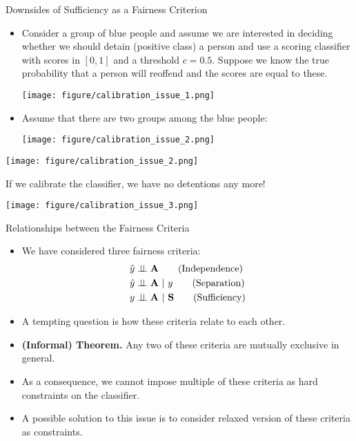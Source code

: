 \documentclass[11pt,compress,t,notes=noshow, xcolor=table]{beamer}
\newcommand{\sens}{\mathbf{A}} %
\begin{document}
\begin{vbframe}{Downsides of Sufficiency as a Fairness Criterion}
	\footnotesize{
		\begin{itemize}
			\item Consider a group of blue people and assume we are interested in deciding whether we should detain (positive class) a person and use a scoring classifier with scores in $[0,1]$ and a threshold $c=0.5.$ Suppose we know the true probability that a person will reoffend and the scores are equal to these.
%			
			\begin{center}
				\texttt{[image: figure/calibration\_issue\_1.png]}
			\end{center}  
			\item Assume that there are two groups among the blue people:
%			
			\begin{center}
				\texttt{[image: figure/calibration\_issue\_2.png]}
			\end{center}  
			
		\end{itemize}	
		\framebreak
		
		\begin{center}
			\texttt{[image: figure/calibration\_issue\_2.png]}
		\end{center}  
%		
		If we calibrate the classifier, we have no detentions any more!
%		
		\begin{center}
			\texttt{[image: figure/calibration\_issue\_3.png]}
		\end{center}	
	}
\end{vbframe}


\begin{vbframe}{Relationships between the Fairness Criteria}
	\small{
		\begin{itemize}
			\item We have considered three fairness criteria:
			\begin{align*}
%				
				\yh &\indep \sens \tag{Independence}	\\
%				
				\yh &\indep \sens ~|~ y  \tag{Separation}\\ 
%				
				y &\indep \sens ~|~ 	\mathbf{S} \tag{Sufficiency}
%				
			\end{align*}
			\item A tempting question is how these criteria relate to each other. 
			 
			\item \textbf{(Informal) Theorem.} Any two of these criteria are mutually exclusive in general.
%			 

			\item As a consequence, we cannot impose multiple of these criteria as hard constraints on the classifier.
%			
			\item A possible solution to this issue is to consider relaxed version of these criteria as constraints.
%			
		\end{itemize}
	}
\end{vbframe}
\end{document}
